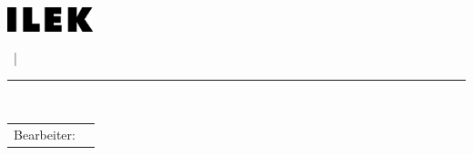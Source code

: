 \begin{titlepage}
    \graphicspath{{_A_frontmatter/02_cover/images/}}
    
	\begin{minipage}[t]{60mm}
		\begin{flushleft}
			\hspace{2.0pt}\includegraphics[width=25mm]{ILEK-logo.jpg}
		\end{flushleft}
	\end{minipage}
	\begin{minipage}[t]{70mm}
		\begin{flushleft}
			{\fontsize{14}{20}\sffamily{\MakeUppercase{\TypDerArbeit}}}
		\end{flushleft}	
	\end{minipage}
	\begin{minipage}[t]{33mm}
		\begin{flushright}
			{\fontsize{14}{20}\sffamily{\NummerDerArbeit}~|~\textsf{\EndeJahr}}
		\end{flushright}
	\end{minipage}
	\begin{center} 
		\vspace{-16.0pt}\nointerlineskip\rule{\textwidth}{0.4pt}\\ 
		\vspace{2.0pt}\nointerlineskip
	\end{center}
	
	\vspace{10mm}
	\hspace{60mm}
	\begin{minipage}[c]{105mm}
		\begin{minipage}[t][4cm][c]{\textwidth}
			\LARGE{\textbf{\TitelDerArbeit}}
		\end{minipage}
		\hspace{0mm} 
		
		\vspace{5mm}
		\hspace{-3.0mm} 
		\begin{tabular}{p{2.5cm}l}
			\textsf{Bearbeiter:}&\textsf{\StudentVorname\:\StudentNachname} \\
		\end{tabular}
		

\end{minipage}
\end{titlepage}

